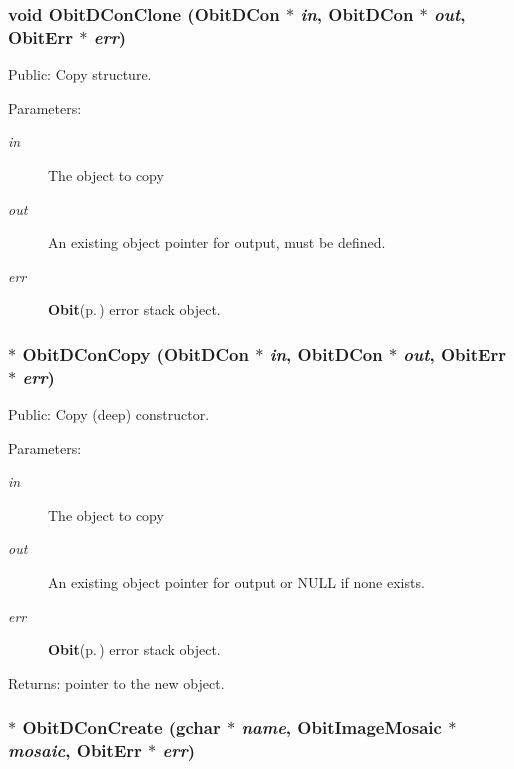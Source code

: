 \subsubsection{\setlength{\rightskip}{0pt plus 5cm}void Obit\-DCon\-Clone ({\bf Obit\-DCon} $\ast$ {\em in}, {\bf Obit\-DCon} $\ast$ {\em out}, {\bf Obit\-Err} $\ast$ {\em err})}\label{ObitDCon_8h_a10}


Public: Copy structure. 

\begin{Desc}
\item[Parameters:]
\begin{description}
\item[{\em in}]The object to copy \item[{\em out}]An existing object pointer for output, must be defined. \item[{\em err}]{\bf Obit}{\rm (p.\,\pageref{structObit})} error stack object. \end{description}
\end{Desc}
\subsubsection{$\ast$ Obit\-DCon\-Copy ({\bf Obit\-DCon} $\ast$ {\em in}, {\bf Obit\-DCon} $\ast$ {\em out}, {\bf Obit\-Err} $\ast$ {\em err})}\label{ObitDCon_8h_a9}


Public: Copy (deep) constructor. 

\begin{Desc}
\item[Parameters:]
\begin{description}
\item[{\em in}]The object to copy \item[{\em out}]An existing object pointer for output or NULL if none exists. \item[{\em err}]{\bf Obit}{\rm (p.\,\pageref{structObit})} error stack object. \end{description}
\end{Desc}
\begin{Desc}
\item[Returns:]pointer to the new object. \end{Desc}
\subsubsection{$\ast$ Obit\-DCon\-Create (gchar $\ast$ {\em name}, {\bf Obit\-Image\-Mosaic} $\ast$ {\em mosaic}, {\bf Obit\-Err} $\ast$ {\em err})}\label{ObitDCon_8h_a7}


